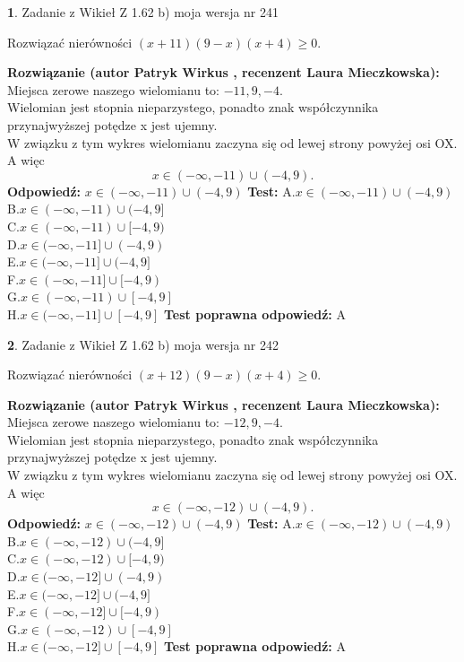 \documentclass[12pt, a4paper]{article}
\theoremstyle{definition} %
\newtheorem{zad}{}
\newcommand{\zadStart}[1]{\begin{zad}#1\newline}
\newcommand{\zadStop}{\end{zad}}
\newcommand{\rozwStart}[2]{\noindent \textbf{Rozwiązanie (autor #1 , recenzent #2): }\newline}
\newcommand{\rozwStop}{\newline}
\newcommand{\odpStart}{\noindent \textbf{Odpowiedź:}\newline}
\newcommand{\odpStop}{\newline}
\newcommand{\testStart}{\noindent \textbf{Test:}\newline}
\newcommand{\testStop}{\newline}
\newcommand{\kluczStart}{\noindent \textbf{Test poprawna odpowiedź:}\newline}
\newcommand{\kluczStop}{\newline}
\begin{document}
\zadStart{Zadanie z Wikieł Z 1.62 b) moja wersja nr 241}

Rozwiązać nierówności $(x+11)(9-x)(x+4)\ge0$.
\zadStop
\rozwStart{Patryk Wirkus}{Laura Mieczkowska}
Miejsca zerowe naszego wielomianu to: $-11, 9, -4$.\\
Wielomian jest stopnia nieparzystego, ponadto znak współczynnika przy\linebreak najwyższej potędze x jest ujemny.\\ W związku z tym wykres wielomianu zaczyna się od lewej strony powyżej osi OX. A więc $$x \in (-\infty,-11) \cup (-4,9).$$
\rozwStop
\odpStart
$x \in (-\infty,-11) \cup (-4,9)$
\odpStop
\testStart
A.$x \in (-\infty,-11) \cup (-4,9)$\\
B.$x \in (-\infty,-11) \cup (-4,9]$\\
C.$x \in (-\infty,-11) \cup [-4,9)$\\
D.$x \in (-\infty,-11] \cup (-4,9)$\\
E.$x \in (-\infty,-11] \cup (-4,9]$\\
F.$x \in (-\infty,-11] \cup [-4,9)$\\
G.$x \in (-\infty,-11) \cup [-4,9]$\\
H.$x \in (-\infty,-11] \cup [-4,9]$
\testStop
\kluczStart
A
\kluczStop



\zadStart{Zadanie z Wikieł Z 1.62 b) moja wersja nr 242}

Rozwiązać nierówności $(x+12)(9-x)(x+4)\ge0$.
\zadStop
\rozwStart{Patryk Wirkus}{Laura Mieczkowska}
Miejsca zerowe naszego wielomianu to: $-12, 9, -4$.\\
Wielomian jest stopnia nieparzystego, ponadto znak współczynnika przy\linebreak najwyższej potędze x jest ujemny.\\ W związku z tym wykres wielomianu zaczyna się od lewej strony powyżej osi OX. A więc $$x \in (-\infty,-12) \cup (-4,9).$$
\rozwStop
\odpStart
$x \in (-\infty,-12) \cup (-4,9)$
\odpStop
\testStart
A.$x \in (-\infty,-12) \cup (-4,9)$\\
B.$x \in (-\infty,-12) \cup (-4,9]$\\
C.$x \in (-\infty,-12) \cup [-4,9)$\\
D.$x \in (-\infty,-12] \cup (-4,9)$\\
E.$x \in (-\infty,-12] \cup (-4,9]$\\
F.$x \in (-\infty,-12] \cup [-4,9)$\\
G.$x \in (-\infty,-12) \cup [-4,9]$\\
H.$x \in (-\infty,-12] \cup [-4,9]$
\testStop
\kluczStart
A
\kluczStop
\end{document}

